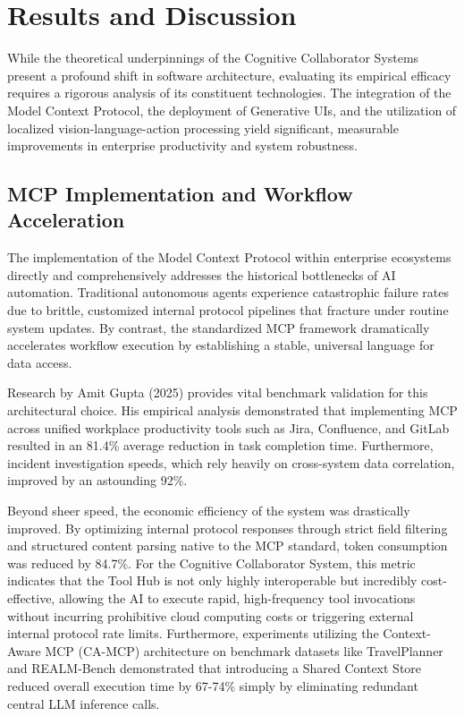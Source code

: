 \documentclass[12pt, a4paper]{report}
\begin{document}
\chapter{Results and Discussion}
While the theoretical underpinnings of the Cognitive Collaborator Systems present a profound shift in software architecture, evaluating its empirical efficacy requires a rigorous analysis of its constituent technologies. The integration of the Model Context Protocol, the deployment of Generative UIs, and the utilization of localized vision-language-action processing yield significant, measurable improvements in enterprise productivity and system robustness.

\section{MCP Implementation and Workflow Acceleration}
The implementation of the Model Context Protocol within enterprise ecosystems directly and comprehensively addresses the historical bottlenecks of AI automation. Traditional autonomous agents experience catastrophic failure rates due to brittle, customized internal protocol pipelines that fracture under routine system updates. By contrast, the standardized MCP framework dramatically accelerates workflow execution by establishing a stable, universal language for data access.\cite{hallam2026}

Research by Amit Gupta (2025) provides vital benchmark validation for this architectural choice. His empirical analysis demonstrated that implementing MCP across unified workplace productivity tools such as Jira, Confluence, and GitLab resulted in an 81.4\% average reduction in task completion time.\cite{hojo2025} Furthermore, incident investigation speeds, which rely heavily on cross-system data correlation, improved by an astounding 92\%.\cite{hojo2025}

Beyond sheer speed, the economic efficiency of the system was drastically improved. By optimizing internal protocol responses through strict field filtering and structured content parsing native to the MCP standard, token consumption was reduced by 84.7\%.\cite{hojo2025} For the Cognitive Collaborator System, this metric indicates that the Tool Hub is not only highly interoperable but incredibly cost-effective, allowing the AI to execute rapid, high-frequency tool invocations without incurring prohibitive cloud computing costs or triggering external internal protocol rate limits. Furthermore, experiments utilizing the Context-Aware MCP (CA-MCP) architecture on benchmark datasets like TravelPlanner and REALM-Bench demonstrated that introducing a Shared Context Store reduced overall execution time by 67-74\% simply by eliminating redundant central LLM inference calls.\cite{arxiv2601}
\end{document}
